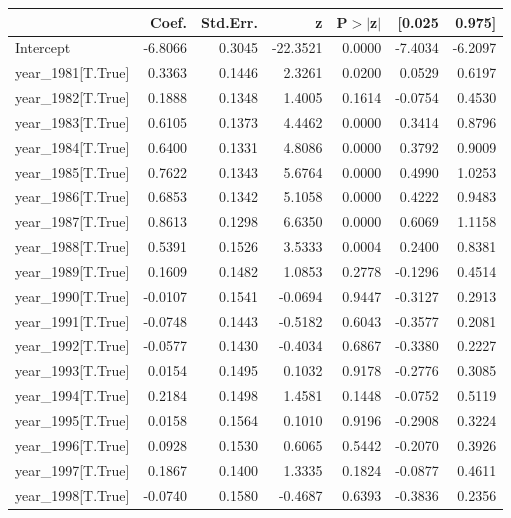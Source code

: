 \begin{table}
\begin{center}
\begin{tabular}{lrrrrrr}
\hline
                   &   Coef. & Std.Err. &        z & P$> |$z$|$ &  [0.025 &  0.975]  \\
\hline
Intercept          & -6.8066 &   0.3045 & -22.3521 &      0.0000 & -7.4034 & -6.2097  \\
year\_1981[T.True] &  0.3363 &   0.1446 &   2.3261 &      0.0200 &  0.0529 &  0.6197  \\
year\_1982[T.True] &  0.1888 &   0.1348 &   1.4005 &      0.1614 & -0.0754 &  0.4530  \\
year\_1983[T.True] &  0.6105 &   0.1373 &   4.4462 &      0.0000 &  0.3414 &  0.8796  \\
year\_1984[T.True] &  0.6400 &   0.1331 &   4.8086 &      0.0000 &  0.3792 &  0.9009  \\
year\_1985[T.True] &  0.7622 &   0.1343 &   5.6764 &      0.0000 &  0.4990 &  1.0253  \\
year\_1986[T.True] &  0.6853 &   0.1342 &   5.1058 &      0.0000 &  0.4222 &  0.9483  \\
year\_1987[T.True] &  0.8613 &   0.1298 &   6.6350 &      0.0000 &  0.6069 &  1.1158  \\
year\_1988[T.True] &  0.5391 &   0.1526 &   3.5333 &      0.0004 &  0.2400 &  0.8381  \\
year\_1989[T.True] &  0.1609 &   0.1482 &   1.0853 &      0.2778 & -0.1296 &  0.4514  \\
year\_1990[T.True] & -0.0107 &   0.1541 &  -0.0694 &      0.9447 & -0.3127 &  0.2913  \\
year\_1991[T.True] & -0.0748 &   0.1443 &  -0.5182 &      0.6043 & -0.3577 &  0.2081  \\
year\_1992[T.True] & -0.0577 &   0.1430 &  -0.4034 &      0.6867 & -0.3380 &  0.2227  \\
year\_1993[T.True] &  0.0154 &   0.1495 &   0.1032 &      0.9178 & -0.2776 &  0.3085  \\
year\_1994[T.True] &  0.2184 &   0.1498 &   1.4581 &      0.1448 & -0.0752 &  0.5119  \\
year\_1995[T.True] &  0.0158 &   0.1564 &   0.1010 &      0.9196 & -0.2908 &  0.3224  \\
year\_1996[T.True] &  0.0928 &   0.1530 &   0.6065 &      0.5442 & -0.2070 &  0.3926  \\
year\_1997[T.True] &  0.1867 &   0.1400 &   1.3335 &      0.1824 & -0.0877 &  0.4611  \\
year\_1998[T.True] & -0.0740 &   0.1580 &  -0.4687 &      0.6393 & -0.3836 &  0.2356  \\

\end{tabular}
\end{center}
\end{table}
